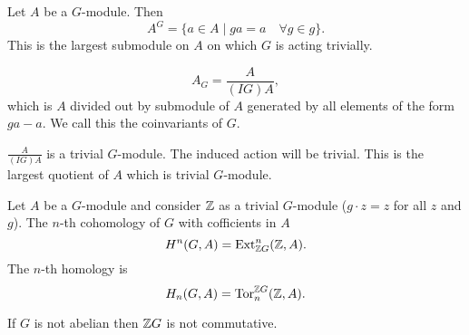 \begin{definition}
    Let $A$ be a $G$-module.
    Then 
    \[
    A^{G} = \{a  \in  A  \mid  g a = a \quad \forall g \in g\} 
    .\] 
    This is the largest submodule on $A$ on which $G$ is acting trivially.

    \end{definition}
    \begin{definition}
    \[
        A_G = \frac{A}{(IG) A}
    ,\] 
    which is $A$ divided out by submodule of  $A$ generated by all elements of the form  $ga - a$.
    We call this the coinvariants of $G$.
\end{definition}

\begin{remark}
    $\frac{A}{(IG)A}$ is a trivial $G$-module.
    The induced action will be trivial.
    This is the largest quotient of $A$ which is trivial  $G$-module.
\end{remark}


\begin{definition}
    Let $A$ be a $G$-module and consider $\mathbb{Z}$ as a trivial $G$-module  ($g\cdot z = z$ for all $z$ and $g$).
    The $n$-th cohomology of $G$ with cofficients in  $A$ 
     \[
         H^{n}(G, A) = \operatorname{Ext}_{\mathbb{Z} G}^{n} (\mathbb{Z}, A)
    .\] 
    The $n$-th homology is
    \[
        H_n(G, A) = \operatorname{Tor}^{\mathbb{Z} G}_n(\mathbb{Z}, A)
    .\] 
\end{definition}

\begin{remark}
If $G$ is not abelian then $\mathbb{Z} G$ is not commutative.
\end{remark}
